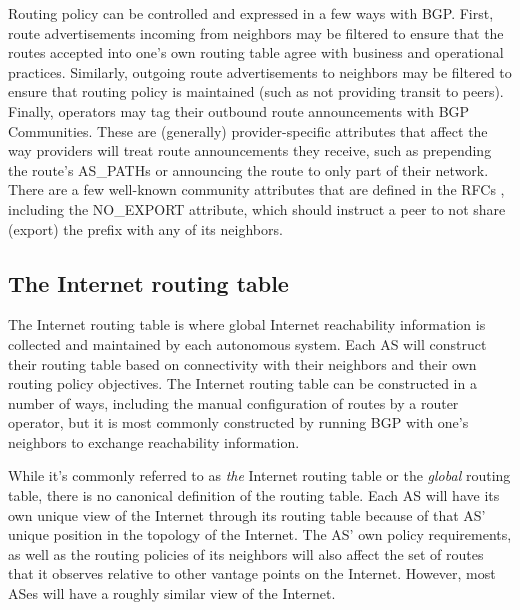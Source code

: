 
Routing policy can be controlled and expressed in a few ways with BGP.  First,
route advertisements incoming from neighbors may be filtered to ensure that the
routes accepted into one's own routing table agree with business and
operational practices. Similarly, outgoing route advertisements to neighbors
may be filtered to ensure that routing policy is maintained (such as not
providing transit to peers). Finally, operators may tag their outbound route
announcements with BGP Communities. These are (generally) provider-specific
attributes that affect the way providers will treat route announcements they
receive, such as prepending the route's AS\_PATHs or announcing the route to
only part of their network. There are a few well-known community attributes
that are defined in the RFCs \cite{rfc1997}, including the NO\_EXPORT
attribute, which should instruct a peer to not share (export) the prefix with
any of its neighbors.

\subsection{The Internet routing table}

The Internet routing table is where global Internet reachability information is
collected and maintained by each autonomous system. Each AS will construct
their routing table based on connectivity with their neighbors and their
own routing policy objectives. The Internet routing table can be constructed in
a number of ways, including the manual configuration of routes by a router
operator, but it is most commonly constructed by running BGP with one's
neighbors to exchange reachability information.

While it's commonly referred to as \emph{the} Internet routing table or the
\emph{global} routing table, there is no canonical definition of the routing
table. Each AS will have its own unique view of the Internet through its
routing table because of that AS' unique position in the topology of the
Internet. The AS' own policy requirements, as well as the routing policies of
its neighbors will also affect the set of routes that it observes relative to
other vantage points on the Internet. However, most ASes will have a roughly
similar view of the Internet.

